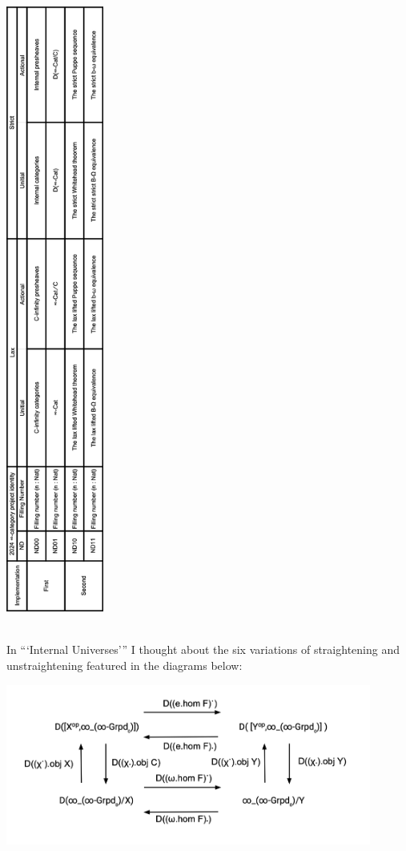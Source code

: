 \documentclass{book}
\theoremstyle{definition}
\begin{document}
\begin{center}
\includegraphics[width=0.24\textwidth]{mastertable.png}  \\
\end{center}
\thispagestyle{empty}

\newpage

\ \\

In ```Internal Universes''' I thought about the six variations of straightening and unstraightening featured in the diagrams below:\\


\begin{center}
\includegraphics[width=0.9\textwidth]{ND01.png} \\
\end{center}
\end{document}

